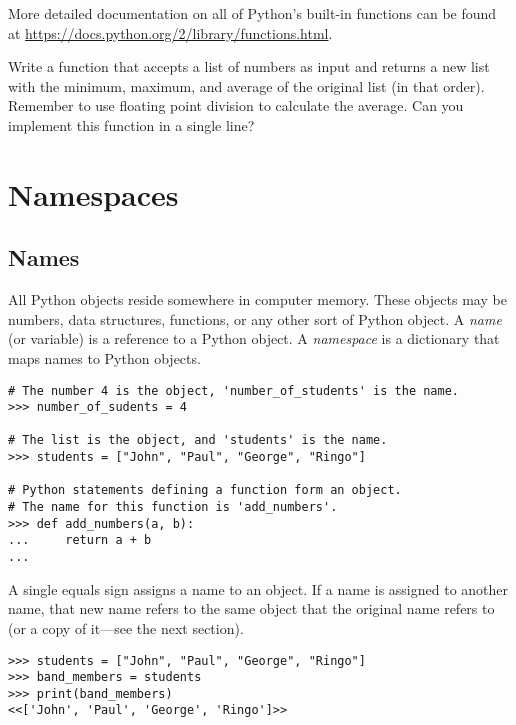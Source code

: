 More detailed documentation on all of Python's built-in functions can be found at \url{https://docs.python.org/2/library/functions.html}.

\begin{problem} %
Write a function that accepts a list of numbers as input and returns a new list with the minimum, maximum, and average of the original list (in that order).
Remember to use floating point division to calculate the average.
Can you implement this function in a single line?
\end{problem}

\section*{Namespaces} %

\subsection*{Names} %
All Python objects reside somewhere in computer memory.
These objects may be numbers, data structures, functions, or any other sort of Python object.
A \emph{name} (or variable) is a reference to a Python object.
A \emph{namespace} is a dictionary that maps names to Python objects.

\begin{lstlisting}
# The number 4 is the object, 'number_of_students' is the name.
>>> number_of_sudents = 4

# The list is the object, and 'students' is the name.
>>> students = ["John", "Paul", "George", "Ringo"]

# Python statements defining a function form an object.
# The name for this function is 'add_numbers'.
>>> def add_numbers(a, b):
...     return a + b
...
\end{lstlisting}

A single equals sign assigns a name to an object.
If a name is assigned to another name, that new name refers to the same object that the original name refers to (or a copy of it---see the next section).

\begin{lstlisting}
>>> students = ["John", "Paul", "George", "Ringo"]
>>> band_members = students
>>> print(band_members)
<<['John', 'Paul', 'George', 'Ringo']>>
\end{lstlisting}

